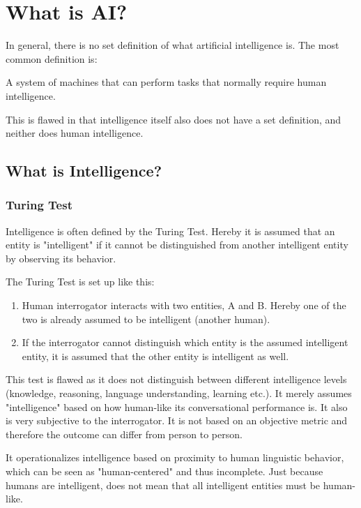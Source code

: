 \documentclass[
../EiKI_Summary.tex,
]
{subfiles}
\begin{document}
\section{What is AI?}
In general, there is no set definition of what artificial intelligence is. 
The most common definition is:

\begin{center}
    \begin{smalldefbox*}
        A system of machines that can perform tasks that normally require human intelligence.
    \end{smalldefbox*}
\end{center}
This is flawed in that intelligence itself also does not have a set definition, and neither does human intelligence.

\subsection{What is Intelligence?}
\subsubsection{Turing Test}
Intelligence is often defined by the Turing Test.
Hereby it is assumed that an entity is "intelligent" if it cannot be distinguished from another intelligent entity by observing its behavior.

The Turing Test is set up like this:

\begin{enumerate}
    \item Human interrogator interacts with two entities, A and B. Hereby one of the two is already assumed to be intelligent (another human).
    \item If the interrogator cannot distinguish which entity is the assumed intelligent entity, it is assumed that the other entity is intelligent as well.
\end{enumerate}

This test is flawed as it does not distinguish between different intelligence levels (knowledge, reasoning, language understanding, learning etc.). It merely assumes "intelligence" based on how human-like its conversational performance is. It also is very subjective to the interrogator. It is not based on an objective metric and therefore the outcome can differ from person to person.

It operationalizes intelligence based on proximity to human linguistic behavior, which can be seen as "human-centered" and thus incomplete. Just because humans are intelligent, does not mean that all intelligent entities must be human-like.
\end{document}
